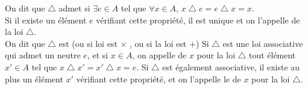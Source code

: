 \documentclass{book}
\begin{document}
\begin{DefinitionProposition}
On dit que $\bigtriangleup$ admet  si $\exists e\in A$ tel que $\forall x\in A$, $x \bigtriangleup e = e \bigtriangleup x = x$.\\
Si il existe un élément $e$ vérifiant cette propriété, il est unique et on l'appelle   de la loi $\bigtriangleup$.\\
On dit que $\bigtriangleup$ est    (ou  si loi est $\times$ , ou  si la loi est $+$)
  Si $\bigtriangleup$ est une loi associative qui admet un neutre $e$, et si $x\in A$, on appelle  de $x$ pour la loi $\bigtriangleup$ tout élément $x'\in A$ tel que $x \bigtriangleup x' = x' \bigtriangleup x = e$.
  Si $\bigtriangleup$ est également associative, il existe au plus un élément $x'$ vérifiant cette propriété, et on l'appelle le   de $x$ pour la loi $\bigtriangleup$.

\end{DefinitionProposition}
\end{document}
